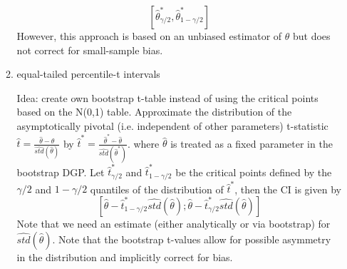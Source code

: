 \begin{enumerate}
\begin{enumerate}
\begin{solution}
                        $$[\hat{\theta}^\ast_{\gamma/2},\hat{\theta}^\ast_{1-\gamma/2}]$$ However, this approach is based on an unbiased estimator of $\theta$ but does not correct for small-sample bias.
                    \end{solution}
              \item equal-tailed percentile-t intervals
                    \begin{solution}
                        Idea: create own bootstrap t-table instead of using the critical points based on the N(0,1) table. Approximate the distribution of the asymptotically pivotal (i.e. independent of other parameters) t-statistic $\hat{t}=\frac{\hat{\theta}-\theta}{\widehat{std}(\hat{\theta})}$ by $\hat{t}^\ast = \frac{\hat{\theta}^\ast-\hat{\theta}}{\widehat{std}(\hat{\theta}^\ast)}$. where $\hat{\theta}$ is treated as a fixed parameter in the bootstrap DGP. Let $\hat{t}^\ast_{\gamma/2}$ and $\hat{t}^\ast_{1-\gamma/2}$ be the critical points defined by the $\gamma/2$ and $1-\gamma/2$ quantiles of the distribution of $\hat{t}^\ast$, then the CI is given by
                        $$[\hat{\theta}-\hat{t}^\ast_{1-\gamma/2} \widehat{std}(\hat{\theta}); \hat{\theta}-\hat{t}^\ast_{\gamma/2} \widehat{std}(\hat{\theta})]$$ Note that we need an estimate (either analytically or via bootstrap) for $\widehat{std}(\hat{\theta})$. Note that the bootstrap t-values allow for possible asymmetry in the distribution and implicitly correct for bias.
                    \end{solution}
          \end{enumerate}
\end{enumerate}